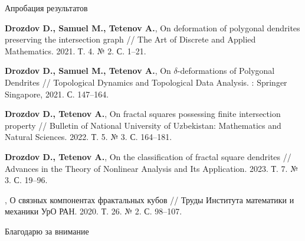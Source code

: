\documentclass[aspectratio=1610, 10pt, notheorems]{beamer}
\begin{document}
%
%
%	
%
%
%	


\begin{frame}{Апробация результатов}

{\normalsize
\begin{thebibliography}{9}
{\bf Drozdov D., Samuel M., Tetenov A.},
On deformation of polygonal dendrites preserving the intersection graph //
The Art of Discrete and Applied Mathematics. 2021. Т. 4. № 2. С. 1--21.

{\bf Drozdov D., Samuel M., Tetenov A.}, 
On $\delta$-deformations of Polygonal Dendrites // 
Topological Dynamics and Topological Data Analysis. : Springer Singapore, 2021. С. 147--164.

{\bf Drozdov D., Tetenov A.}, 
On fractal squares possessing finite intersection property // 
Bulletin of National University of Uzbekistan: Mathematics and Natural Sciences. 2022. Т. 5. № 3. С. 164--181.

{\bf Drozdov D., Tetenov A.}, 
On the classification of fractal square dendrites // 
Advances in the Theory of Nonlinear Analysis and Its Application. 2023. Т. 7. № 3. С. 19--96.

,
О связных компонентах фрактальных кубов // 
Труды Института математики и механики УрО РАН. 2020. Т. 26. № 2. С. 98--107.
\end{thebibliography}}
\end{frame}


\begin{frame}{}
\begin{center}
\Huge Благодарю за внимание
\end{center}
\end{frame}
\end{document}
